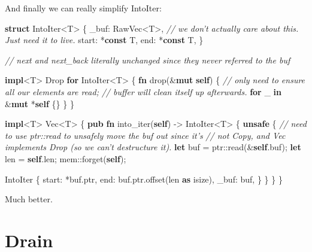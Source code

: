 \documentclass[a4paper,]{book}
\newenvironment{Shaded}{\begin{snugshade}}{\end{snugshade}}
\newcommand{\KeywordTok}[1]{\textcolor[rgb]{0.13,0.29,0.53}{\textbf{{#1}}}}
\newcommand{\DataTypeTok}[1]{\textcolor[rgb]{0.13,0.29,0.53}{{#1}}}
\newcommand{\CommentTok}[1]{\textcolor[rgb]{0.56,0.35,0.01}{\textit{{#1}}}}
\newcommand{\BuiltInTok}[1]{{#1}}
\newcommand{\NormalTok}[1]{{#1}}
\begin{document}
And finally we can really simplify IntoIter:

\begin{Shaded}
\begin{Highlighting}[]
\KeywordTok{struct} \NormalTok{IntoIter<T> \{}
    \NormalTok{_buf: RawVec<T>, }\CommentTok{// we don't actually care about this. Just need it to live.}
    \NormalTok{start: *}\KeywordTok{const} \NormalTok{T,}
    \NormalTok{end: *}\KeywordTok{const} \NormalTok{T,}
\NormalTok{\}}

\CommentTok{// next and next_back literally unchanged since they never referred to the buf}

\KeywordTok{impl}\NormalTok{<T> }\BuiltInTok{Drop} \KeywordTok{for} \NormalTok{IntoIter<T> \{}
    \KeywordTok{fn} \NormalTok{drop(&}\KeywordTok{mut} \KeywordTok{self}\NormalTok{) \{}
        \CommentTok{// only need to ensure all our elements are read;}
        \CommentTok{// buffer will clean itself up afterwards.}
        \KeywordTok{for} \NormalTok{_ }\KeywordTok{in} \NormalTok{&}\KeywordTok{mut} \NormalTok{*}\KeywordTok{self} \NormalTok{\{\}}
    \NormalTok{\}}
\NormalTok{\}}

\KeywordTok{impl}\NormalTok{<T> }\DataTypeTok{Vec}\NormalTok{<T> \{}
    \KeywordTok{pub} \KeywordTok{fn} \NormalTok{into_iter(}\KeywordTok{self}\NormalTok{) -> IntoIter<T> \{}
        \KeywordTok{unsafe} \NormalTok{\{}
            \CommentTok{// need to use ptr::read to unsafely move the buf out since it's}
            \CommentTok{// not Copy, and Vec implements Drop (so we can't destructure it).}
            \KeywordTok{let} \NormalTok{buf = ptr::read(&}\KeywordTok{self}\NormalTok{.buf);}
            \KeywordTok{let} \NormalTok{len = }\KeywordTok{self}\NormalTok{.len;}
            \NormalTok{mem::forget(}\KeywordTok{self}\NormalTok{);}

            \NormalTok{IntoIter \{}
                \NormalTok{start: *buf.ptr,}
                \NormalTok{end: buf.ptr.offset(len }\KeywordTok{as} \DataTypeTok{isize}\NormalTok{),}
                \NormalTok{_buf: buf,}
            \NormalTok{\}}
        \NormalTok{\}}
    \NormalTok{\}}
\NormalTok{\}}
\end{Highlighting}
\end{Shaded}

Much better.

\section{Drain}\label{sec--vec-drain}
\end{document}
